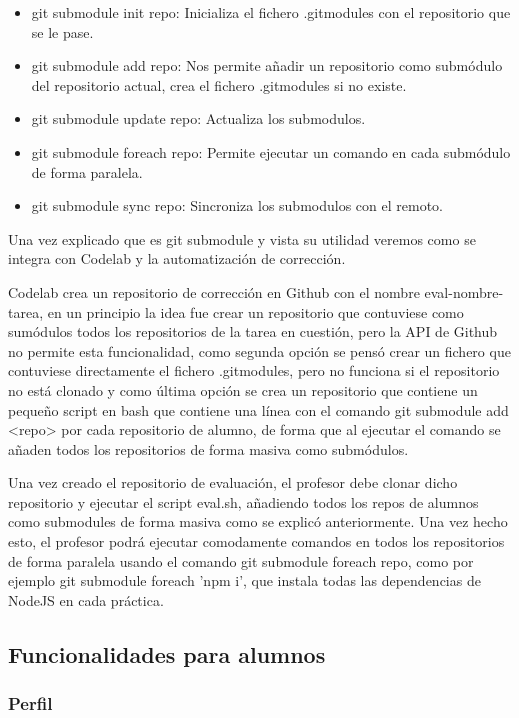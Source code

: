 \begin{itemize}
\item git submodule init repo: Inicializa el fichero .gitmodules con el repositorio que se le pase.
\item git submodule add repo: Nos permite añadir un repositorio como submódulo del repositorio actual, crea el fichero .gitmodules si no existe.
\item git submodule update repo: Actualiza los submodulos.
\item git submodule foreach repo: Permite ejecutar un comando en cada submódulo de forma paralela.
\item git submodule sync repo: Sincroniza los submodulos con el remoto.
\end{itemize}

Una vez explicado que es git submodule y vista su utilidad veremos como se integra con Codelab y la automatización de corrección. 

Codelab crea un repositorio de corrección en Github con el nombre eval-nombre-tarea, en un principio la idea fue crear un repositorio que contuviese como sumódulos todos los repositorios de la tarea en cuestión, pero la API de Github no permite esta funcionalidad, como segunda opción se pensó crear un fichero que contuviese directamente el fichero .gitmodules, pero no funciona si el repositorio no está clonado y como última opción se crea un repositorio que contiene un pequeño script en bash que contiene una línea con el comando git submodule add <repo> por cada repositorio de alumno, de forma que al ejecutar el comando se añaden todos los repositorios de forma masiva como submódulos.

Una vez creado el repositorio de evaluación, el profesor debe clonar dicho repositorio y ejecutar el script eval.sh, añadiendo todos los repos de alumnos como submodules de forma masiva como se explicó anteriormente. Una vez hecho esto, el profesor podrá ejecutar comodamente comandos en todos los repositorios de forma paralela usando el comando git submodule foreach repo, como por ejemplo git submodule foreach 'npm i', que instala todas las dependencias de NodeJS en cada práctica.

\newpage 

\subsection{Funcionalidades para alumnos}
\label{3:6:3}

\subsubsection{Perfil}

